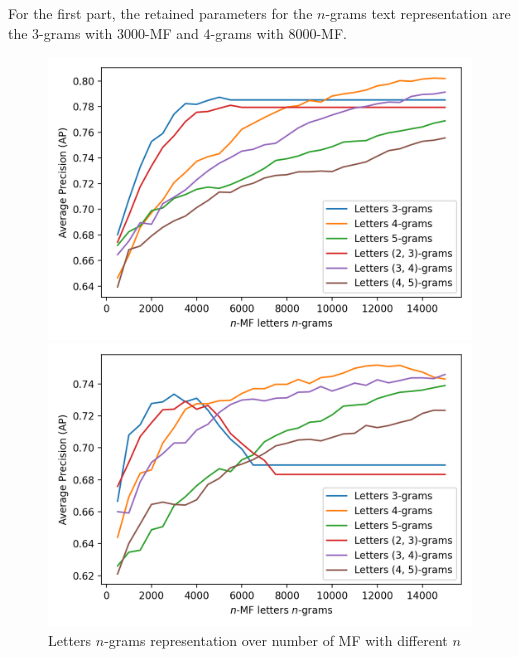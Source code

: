 For the first part, the retained parameters for the $n$-grams text representation are the $3$-grams with $3000$-MF and $4$-grams with $8000$-MF.

\begin{figure}
  \caption{Letters $n$-grams representation over number of MF with different $n$}
  \label{fig:letter_ngrams}

  \label{fig:letter_ngrams_oxquarry}
  \includegraphics[width=\linewidth]{img/letter_ngrams_oxquarry.png}

  \vspace{0.5cm}

  \label{fig:letter_ngrams_brunet}
  \includegraphics[width=\linewidth]{img/letter_ngrams_brunet.png}

  \vspace{0.5cm}


\end{figure}
